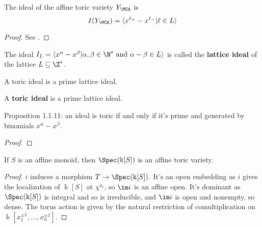 \begin{proposition}
  \label{1-1-9-ideal-ya}

  The ideal of the affine toric variety $Y_\MCA$ is
  \[
    I(Y_\MCA) = \langle x^{\ell_+} - x^{\ell_-} | \ell \in L\rangle
  \]
\end{proposition}
\begin{proof}
  \uses{}

  See \cite{Cox_2011}.
\end{proof}


\begin{definition}
  \label{1-1-10-lattice-ideal}
  \uses{}
  \leanok

  The ideal $I_L = \langle x^\alpha - x^\beta | \alpha, \beta \in \N^s \text{ and } \alpha - \beta \in L\rangle$ is called the {\bf lattice ideal} of the lattice $L \subseteq \Z^s$.

  A toric ideal is a prime lattice ideal.
\end{definition}


\begin{definition}
  \label{1-1-10-toric-ideal}
  \leanok
  A {\bf toric ideal} is a prime lattice ideal.
\end{definition}


\begin{proposition}
  \label{1-1-11-toric-ideal-gen-binomial}

  Proposition 1.1.11: an ideal is toric if and only if it's prime and generated by binomials $x^\alpha - x^\beta$.
\end{proposition}
\begin{proof}

\end{proof}


\begin{proposition}
  \label{1-1-14-aff-tor-var-spec-aff-mon-alg}
  \leanok

  If $S$ is an affine monoid, then $\Spec(\Bbbk[S])$ is an affine toric variety.
\end{proposition}
\begin{proof}

  $i$ induces a morphism $T \to \Spec(\Bbbk[S])$. It's an open embedding as $i$ gives the localization of $\Bbbk[S]$ at $\chi^{a_i}$, so $\im i$ is an affine open. It's dominant as $\Spec(\Bbbk[S])$ is integral and so is irreducible, and $\im i$ is open and nonempty, so dense. The torus action is given by the natural restriction of comultiplication on $\Bbbk[x_1^{\pm1}, \dotsc, x_n^{\pm1}]$.
\end{proof}


